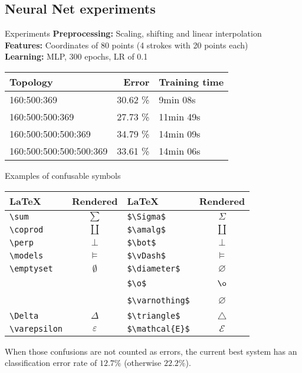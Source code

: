 \subsection{Neural Net experiments}
\begin{frame}{Experiments}
    \textbf{Preprocessing:} Scaling, shifting and linear interpolation\\
    \textbf{Features:} Coordinates of 80 points (4 strokes with 20 points each)\\
    \textbf{Learning:} MLP, 300 epochs, LR of 0.1

\begin{table}[h]
    \begin{tabular}{lrl}
    \toprule
    Topology                & Error    & Training time \\ \midrule
    160:500:369             & 30.62 \% & \hphantom{0}9min 08s      \\
    160:500:500:369         & 27.73 \% & 11min 49s     \\
    160:500:500:500:369     & 34.79 \% & 14min 09s     \\
    160:500:500:500:500:369 & 33.61 \% & 14min 06s     \\
    \bottomrule
    \end{tabular}
\end{table}

\end{frame}

\begin{frame}[fragile]{Examples of confusable symbols}
\begin{table}[ht]
    \centering
    \begin{tabular}{lc|lc}
        \textbf{\LaTeX}& \textbf{Rendered}   & \textbf{\LaTeX}& \textbf{Rendered} \\\midrule
        \verb+\sum+    & $\sum$         & \verb+$\Sigma$+        & $\Sigma$\\
        \verb+\coprod+ & $\coprod$      & \verb+$\amalg$+        & $\amalg$\\
        \verb+\perp+   & $\perp$        & \verb+$\bot$+          & $\bot$\\
        \verb+\models+ & $\models$      & \verb+$\vDash$+        & $\vDash$\\
        \verb+\emptyset+ & $\emptyset$  & \verb+$\diameter$+     & $\diameter$\\
        ~              & ~              & \verb+$\o$+            & $\o$\\
        ~              & ~              & \verb+$\varnothing$+   & $\varnothing$\\
        \verb+\Delta+  & $\Delta$       & \verb+$\triangle$+     & $\triangle$\\
        \verb+\varepsilon+ & $\varepsilon$ & \verb+$\mathcal{E}$+ & $\mathcal{E}$\\
    \end{tabular}
\end{table}

When those confusions are not counted as errors, the current best system
has an classification error rate of $12.7 \%$ (otherwise $22.2 \%$).

\end{frame}